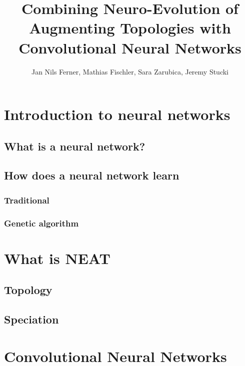 \documentclass[11pt]{article}
\title{Combining Neuro-Evolution of Augmenting Topologies with Convolutional Neural Networks}
\author{Jan Nils Ferner, Mathias Fischler, Sara Zarubica, Jeremy Stucki}
\begin{document}
\maketitle
\newpage

\begin{abstract}
	
	\newpage 
\end{abstract}
	
	\tableofcontents
	\newpage

	\section{Introduction to neural networks}
		\subsection{What is a neural network?}
			
		\subsection{How does a neural network learn}
			\subsubsection{Traditional}
				
			\newpage
			\subsubsection{Genetic algorithm}
				
	\newpage

	\section{What is NEAT}
		
		\subsection{Topology}
			
		\subsection{Speciation}
			
	\newpage

	\section{Convolutional Neural Networks}
\end{document}
